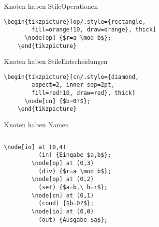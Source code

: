 \begin{Frame}[fragile]{Knoten haben Stile}{Operationen}

  \xxx

  \begin{lstlisting}[gobble=4]
    \begin{tikzpicture}[op/.style={rectangle,
        fill=orange!10, draw=orange}, thick]
      \node[op] {$r=a \mod b$};
    \end{tikzpicture}
  \end{lstlisting}
\end{Frame}

\begin{Frame}[fragile]{Knoten haben Stile}{Entscheidungen}

  \xxx

  \begin{lstlisting}[gobble=4]
    \begin{tikzpicture}[cn/.style={diamond,
        aspect=2, inner sep=2pt,
        fill=red!10, draw=red}, thick]
      \node[cn] {$b=0?$};
    \end{tikzpicture}
  \end{lstlisting}
\end{Frame}

\begin{Frame}[t,fragile]{Knoten haben Namen}
  \xxx\xxx
  \begin{columns}[T]
    \column{30mm}
    \column{55mm}
      \xxx
      \begin{lstlisting}[gobble=8]
        \node[io] at (0,4)
          (in) {Eingabe $a,b$};
        \node[op] at (0,3)
          (div) {$r=a \mod b$};
        \node[op] at (0,2)
          (set) {$a=b,\ b=r$};
        \node[cn] at (0,1)
          (cond) {$b=0?$};
        \node[io] at (0,0)
          (out) {Ausgabe $a$};
      \end{lstlisting}
  \end{columns}
\end{Frame}

